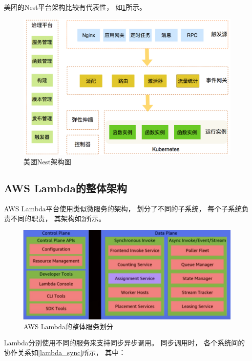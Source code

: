 美团的Nest平台架构比较有代表性，
如\cref{nest_arch}所示。

\begin{figure}[ht!]
    \centering
    \includegraphics[width=\linewidth]{images/nest_arch.png}
    \caption{美团Nest架构图\cite{meituan_serverless_nest}}
    \label{nest_arch}
\end{figure}

\subsection{AWS Lambda的整体架构}
AWS Lambda平台使用类似微服务的架构，
划分了不同的子系统，
每个子系统负责不同的职责，
其架构如\cref{lambda_services}所示。

\begin{figure}[ht!]
    \centering
    \includegraphics[width=\linewidth]{images/lambda_services.png}
    \caption{AWS Lambda的整体服务划分\cite{aws_lambda_2022}}
    \label{lambda_services}
\end{figure}

Lambda分别使用不同的服务来支持同步异步调用。
同步调用时，
各个系统间的协作关系如\cref{lambda_sync}所示，
其中：

